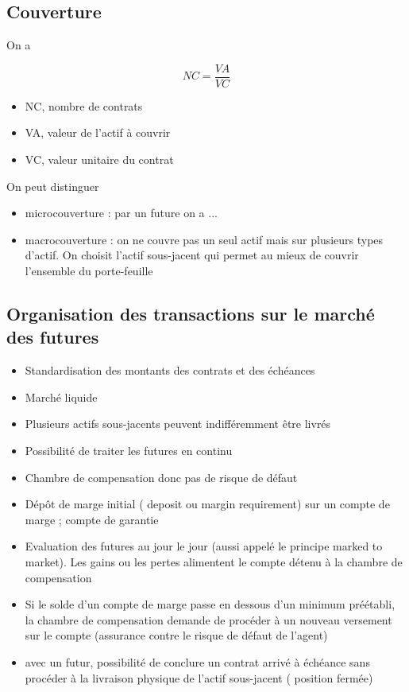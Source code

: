 	\subsection{Couverture}
	
	On a
	
	$$NC = \frac{VA}{VC}$$
	
	\begin{itemize}
		\item NC, nombre de contrats
		\item VA, valeur de l'actif à couvrir
		\item VC, valeur unitaire du contrat
	\end{itemize}

	On peut distinguer
	\begin{itemize}
		\item microcouverture : par un future on a ...
		\item macrocouverture : on ne couvre pas un seul actif mais sur plusieurs types d'actif. On choisit l'actif sous-jacent qui permet au mieux de couvrir l'ensemble du porte-feuille
	\end{itemize}

	\subsection{Organisation des transactions sur le marché des futures}
	
	\begin{itemize}
		\item Standardisation des montants des contrats et des échéances 
		\item Marché liquide 
		\item Plusieurs actifs sous-jacents peuvent indifféremment être livrés 
		\item Possibilité de traiter les futures en continu 
		\item Chambre de compensation donc pas de risque de défaut 
		\item Dépôt de marge initial ( deposit ou margin requirement) sur un compte de marge ; compte de garantie
		\item Evaluation des futures au jour le jour (aussi appelé le principe marked to market). Les gains ou les pertes alimentent le compte détenu à la chambre de compensation
		\item Si le solde d'un compte de marge passe en dessous d'un minimum préétabli, la chambre de compensation demande de procéder à un nouveau versement sur le compte (assurance contre le risque de défaut de l'agent)
		
		\item avec un futur, possibilité de conclure un contrat arrivé à échéance sans procéder à la livraison physique de l'actif sous-jacent ( position fermée)
	\end{itemize}
	
